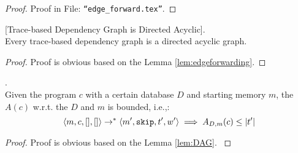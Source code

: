 %
\begin{proof}
Proof in File: {\tt ``edge\_forward.tex''}.
% 
\end{proof}
%
%
%
\begin{lem}
\label{lem:DAG}
[Trace-based Dependency Graph is Directed Acyclic].
\\
%
{
Every trace-based dependency graph is a directed acyclic graph.
}
\end{lem}
%
{
\begin{proof}
Proof is obvious based on the Lemma \ref{lem:edgeforwarding}.
\end{proof}
}
%
\begin{lem}
.
\\
{
Given the program $c$ with a certain database $D$ and starting memory $m$, the $A(c)$ w.r.t. the $D$ and $m$ is bounded, i.e.,:
%
\[
\langle m, c, [], [] \rangle 
\rightarrow^{*} 
\langle m', \mathtt{skip}, t', w' \rangle 
\implies
A_{D, m}(c) \leq |t'|
\]
}
\end{lem}
%
\begin{proof}
{
Proof is obvious based on the Lemma \ref{lem:DAG}.
}
\end{proof}
%
%
\clearpage
%
%
% 
%
\clearpage